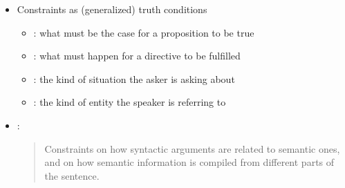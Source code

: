 \documentclass[a4paper,landscape,headrule,footrule]{foils}
\begin{document}
\begin{itemize}
\item Constraints as (generalized) truth conditions
  \begin{itemize}
\item {}: what must be the case for a proposition to be true
\item {}: what must happen for a directive to be fulfilled
\item {}: the kind of situation the asker is asking about
\item {}: the kind of entity the speaker is referring to
\end{itemize}
\item {}: 
  \begin{quote}
    Constraints on how syntactic arguments are related to semantic
    ones, and on how semantic information is compiled from different
    parts of the sentence.
  \end{quote}
\end{itemize}

\end{document}
